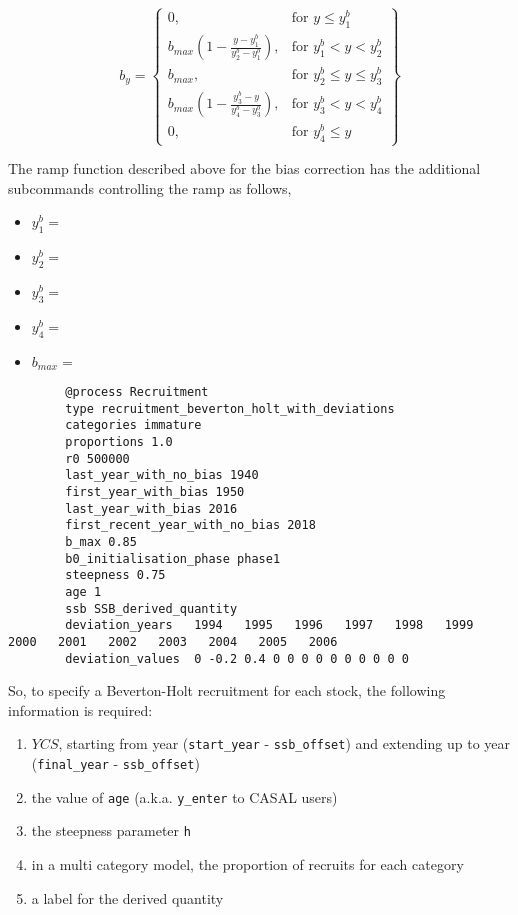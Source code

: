 \begin{equation}\label{eq::bias}
	    b_y = \left\{\begin{array}{lr}
	0, & \text{for }y\leq y_1^b\\
	b_{max}(1 - \frac{y - y_1^b}{y_2^b - y_1^b}), & \text{for } y_1^b < y < y_2^b\\
	b_{max}, & \text{for } y_2^b\leq y \leq y_3^b\\
	b_{max}(1 - \frac{y_3^b - y}{y_4^b - y_3^b}), & \text{for }  y_3^b< y < y_4^b\\
	0, & \text{for } y_4^b\leq y
	\end{array}\right\}
\end{equation}

The ramp function described above for the bias correction has the additional subcommands controlling the ramp as follows, 
\begin{itemize}
	\item $y_1^b = $ 
	\item $y_2^b = $ 
	\item $y_3^b = $ 
	\item $y_4^b = $ 
	\item $b_{max} = $ 
\end{itemize}

{\small{\begin{verbatim}
		@process Recruitment
		type recruitment_beverton_holt_with_deviations
		categories immature
		proportions 1.0
		r0 500000
		last_year_with_no_bias 1940
		first_year_with_bias 1950
		last_year_with_bias 2016
		first_recent_year_with_no_bias 2018
		b_max 0.85
		b0_initialisation_phase phase1
		steepness 0.75
		age 1
		ssb SSB_derived_quantity
		deviation_years   1994   1995   1996   1997   1998   1999   2000   2001   2002   2003   2004   2005   2006
		deviation_values  0 -0.2 0.4 0 0 0 0 0 0 0 0 0 0
\end{verbatim}}}
	
	
So, to specify a Beverton-Holt recruitment for each stock, the following information is required:
\begin{enumerate}
	\item $YCS$, starting from year (\texttt{start\_year} - \texttt{ssb\_offset}) and extending up to year (\texttt{final\_year} - \texttt{ssb\_offset})
	\item the value of \texttt{age} (a.k.a. \texttt{y\_enter} to CASAL users)
	\item the steepness parameter \texttt{h}
	\item in a multi category model, the proportion of recruits for each category
	\item a label for the derived quantity
\end{enumerate}

